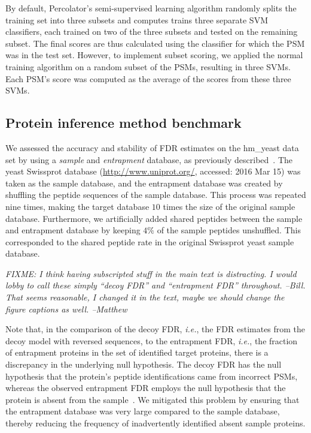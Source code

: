 \documentclass{article}
\begin{document}
By default, Percolator's semi-supervised learning algorithm randomly
splits the training set into three subsets and computes trains three
separate SVM classifiers, each trained on two of the three subsets and
tested on the remaining subset.  The final scores are thus calculated
using the classifier for which the PSM was in the test set. However,
to implement subset scoring, we applied the normal training algorithm
on a random subset of the PSMs, resulting in three SVMs.  Each PSM's
score was computed as the average of the scores from these three SVMs.

\subsection*{Protein inference method benchmark}

We assessed the accuracy and stability of FDR estimates on the
hm\_yeast data set by using a {\em sample} and {\em entrapment}
database, as previously described~\cite{granholm2013determining}. The
yeast Swissprot database (\url{http://www.uniprot.org/}, accessed:
2016 Mar 15) was taken as the sample database, and the entrapment
database was created by shuffling the peptide sequences of the sample
database. This process was repeated nine times, making the target
database $10$ times the size of the original sample database.
Furthermore, we artificially added shared peptides between the sample
and entrapment database by keeping $4\%$ of the sample peptides
unshuffled. This corresponded to the shared peptide rate in the
original Swissprot yeast sample database.

{\em FIXME: I think having subscripted stuff in the main text is
  distracting.  I would lobby to call these simply ``decoy FDR'' and
  ``entrapment FDR'' throughout. --Bill. That seems reasonable, I 
changed it in the text, maybe we should change the figure captions 
as well. --Matthew}

Note that, in the comparison of the decoy FDR, {\em i.e.}, the FDR 
estimates from the decoy model with reversed sequences, to the 
entrapment FDR, {\em i.e.}, the fraction of entrapment proteins in the 
set of identified target proteins, there is a discrepancy in the 
underlying null hypothesis. The decoy FDR has the null hypothesis that 
the protein's peptide identifications came from incorrect PSMs, 
whereas the observed entrapment FDR employs the null hypothesis that 
the protein is absent from the sample~\cite{the:how}. We mitigated 
this problem by ensuring that the entrapment database was very large 
compared to the sample database, thereby reducing the frequency of 
inadvertently identified absent sample proteins.
\end{document}
